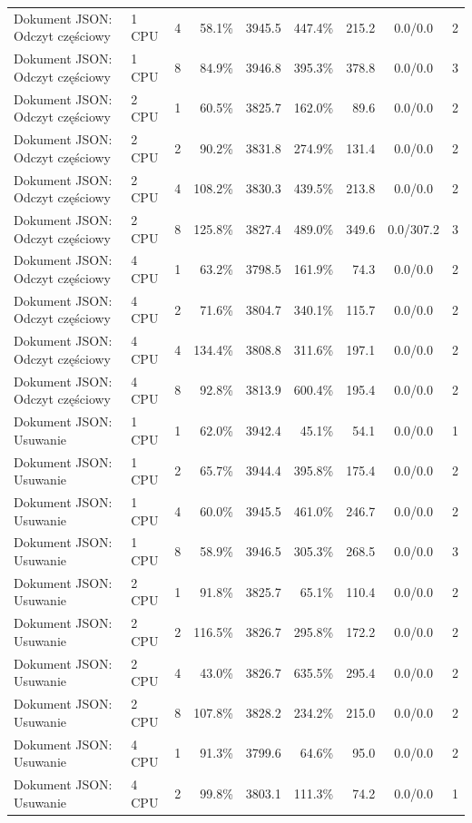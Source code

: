 \begin{table}[ht]
{\begin{tabular}{llcrrrrcc}
Dokument JSON: Odczyt częściowy & 1 CPU & 4 & 58.1\% & 3945.5 & 447.4\% & 215.2 & 0.0/0.0 & 2 \\
Dokument JSON: Odczyt częściowy & 1 CPU & 8 & 84.9\% & 3946.8 & 395.3\% & 378.8 & 0.0/0.0 & 3 \\
Dokument JSON: Odczyt częściowy & 2 CPU & 1 & 60.5\% & 3825.7 & 162.0\% & 89.6 & 0.0/0.0 & 2 \\
Dokument JSON: Odczyt częściowy & 2 CPU & 2 & 90.2\% & 3831.8 & 274.9\% & 131.4 & 0.0/0.0 & 2 \\
Dokument JSON: Odczyt częściowy & 2 CPU & 4 & 108.2\% & 3830.3 & 439.5\% & 213.8 & 0.0/0.0 & 2 \\
Dokument JSON: Odczyt częściowy & 2 CPU & 8 & 125.8\% & 3827.4 & 489.0\% & 349.6 & 0.0/307.2 & 3 \\
Dokument JSON: Odczyt częściowy & 4 CPU & 1 & 63.2\% & 3798.5 & 161.9\% & 74.3 & 0.0/0.0 & 2 \\
Dokument JSON: Odczyt częściowy & 4 CPU & 2 & 71.6\% & 3804.7 & 340.1\% & 115.7 & 0.0/0.0 & 2 \\
Dokument JSON: Odczyt częściowy & 4 CPU & 4 & 134.4\% & 3808.8 & 311.6\% & 197.1 & 0.0/0.0 & 2 \\
Dokument JSON: Odczyt częściowy & 4 CPU & 8 & 92.8\% & 3813.9 & 600.4\% & 195.4 & 0.0/0.0 & 2 \\
Dokument JSON: Usuwanie & 1 CPU & 1 & 62.0\% & 3942.4 & 45.1\% & 54.1 & 0.0/0.0 & 1 \\
Dokument JSON: Usuwanie & 1 CPU & 2 & 65.7\% & 3944.4 & 395.8\% & 175.4 & 0.0/0.0 & 2 \\
Dokument JSON: Usuwanie & 1 CPU & 4 & 60.0\% & 3945.5 & 461.0\% & 246.7 & 0.0/0.0 & 2 \\
Dokument JSON: Usuwanie & 1 CPU & 8 & 58.9\% & 3946.5 & 305.3\% & 268.5 & 0.0/0.0 & 3 \\
Dokument JSON: Usuwanie & 2 CPU & 1 & 91.8\% & 3825.7 & 65.1\% & 110.4 & 0.0/0.0 & 2 \\
Dokument JSON: Usuwanie & 2 CPU & 2 & 116.5\% & 3826.7 & 295.8\% & 172.2 & 0.0/0.0 & 2 \\
Dokument JSON: Usuwanie & 2 CPU & 4 & 43.0\% & 3826.7 & 635.5\% & 295.4 & 0.0/0.0 & 2 \\
Dokument JSON: Usuwanie & 2 CPU & 8 & 107.8\% & 3828.2 & 234.2\% & 215.0 & 0.0/0.0 & 2 \\
Dokument JSON: Usuwanie & 4 CPU & 1 & 91.3\% & 3799.6 & 64.6\% & 95.0 & 0.0/0.0 & 2 \\
Dokument JSON: Usuwanie & 4 CPU & 2 & 99.8\% & 3803.1 & 111.3\% & 74.2 & 0.0/0.0 & 1 \\

\end{tabular}}
\end{table}
